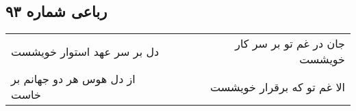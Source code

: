 \begin{center}
\section*{رباعی شماره ۹۳}
\label{sec:sh093}
\begin{longtable}{l p{0.5cm} r}
دل بر سر عهد استوار خویشست
&&
جان در غم تو بر سر کار خویشست
\\
از دل هوس هر دو جهانم بر خاست
&&
الا غم تو که برقرار خویشست
\\
\end{longtable}
\end{center}
